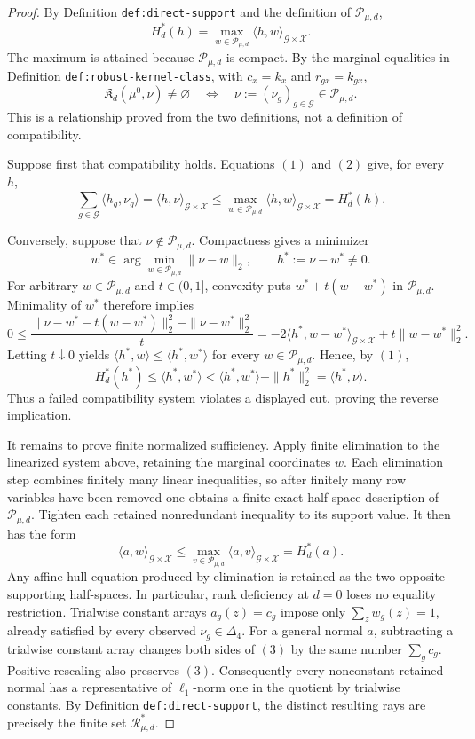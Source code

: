 \documentclass{article}
\begin{document}
\begin{proof}
By Definition \texttt{def:direct-support} and the definition of \(\mathcal P_{\mu,d}\),
\[
 H_d^*(h)
 =\max_{w\in\mathcal P_{\mu,d}}
   \langle h,w\rangle_{\mathcal G\times\mathcal X}.
 \tag{1}
\]
The maximum is attained because \(\mathcal P_{\mu,d}\) is compact.  By the marginal equalities in Definition \texttt{def:robust-kernel-class}, with \(c_x=k_x\) and \(r_{gx}=k_{gx}\),
\[
 \mathfrak K_d(\mu^0,\nu)\ne\varnothing
 \quad\Longleftrightarrow\quad
 \nu:=(\nu_g)_{g\in\mathcal G}\in\mathcal P_{\mu,d}.
 \tag{2}
\]
This is a relationship proved from the two definitions, not a definition of compatibility.

Suppose first that compatibility holds.  Equations \((1)\) and \((2)\) give, for every \(h\),
\[
 \sum_{g\in\mathcal G}\langle h_g,\nu_g\rangle
 =\langle h,\nu\rangle_{\mathcal G\times\mathcal X}
 \le \max_{w\in\mathcal P_{\mu,d}}\langle h,w\rangle_{\mathcal G\times\mathcal X}
 =H_d^*(h).
\]

Conversely, suppose that \(\nu\notin\mathcal P_{\mu,d}\).  Compactness gives a minimizer
\[
 w^*\in\arg\min_{w\in\mathcal P_{\mu,d}}\|\nu-w\|_2,
 \qquad h^*:=\nu-w^*\ne0.
\]
For arbitrary \(w\in\mathcal P_{\mu,d}\) and \(t\in(0,1]\), convexity puts
\(w^*+t(w-w^*)\) in \(\mathcal P_{\mu,d}\).  Minimality of \(w^*\) therefore implies
\[
 0\le
 \frac{\|\nu-w^*-t(w-w^*)\|_2^2-\|\nu-w^*\|_2^2}{t}
 =-2\langle h^*,w-w^*\rangle_{\mathcal G\times\mathcal X}
   +t\|w-w^*\|_2^2.
\]
Letting \(t\downarrow0\) yields
\(\langle h^*,w\rangle\le\langle h^*,w^*\rangle\) for every \(w\in\mathcal P_{\mu,d}\).  Hence, by \((1)\),
\[
 H_d^*(h^*)\le\langle h^*,w^*\rangle
 <\langle h^*,w^*\rangle+\|h^*\|_2^2
 =\langle h^*,\nu\rangle.
\]
Thus a failed compatibility system violates a displayed cut, proving the reverse implication.

It remains to prove finite normalized sufficiency.  Apply finite elimination to the linearized system above, retaining the marginal coordinates \(w\).  Each elimination step combines finitely many linear inequalities, so after finitely many row variables have been removed one obtains a finite exact half-space description of \(\mathcal P_{\mu,d}\).  Tighten each retained nonredundant inequality to its support value.  It then has the form
\[
 \langle a,w\rangle_{\mathcal G\times\mathcal X}\le
 \max_{v\in\mathcal P_{\mu,d}}\langle a,v\rangle_{\mathcal G\times\mathcal X}
 =H_d^*(a).
 \tag{3}
\]
Any affine-hull equation produced by elimination is retained as the two opposite supporting half-spaces.  In particular, rank deficiency at \(d=0\) loses no equality restriction.  Trialwise constant arrays \(a_g(z)=c_g\) impose only
\(\sum_z w_g(z)=1\), already satisfied by every observed \(\nu_g\in\Delta_4\).  For a general normal \(a\), subtracting a trialwise constant array changes both sides of \((3)\) by the same number \(\sum_g c_g\).  Positive rescaling also preserves \((3)\).  Consequently every nonconstant retained normal has a representative of \(\ell_1\)-norm one in the quotient by trialwise constants.  By Definition \texttt{def:direct-support}, the distinct resulting rays are precisely the finite set \(\mathcal R_{\mu,d}^*\).


\end{proof}
\end{document}
